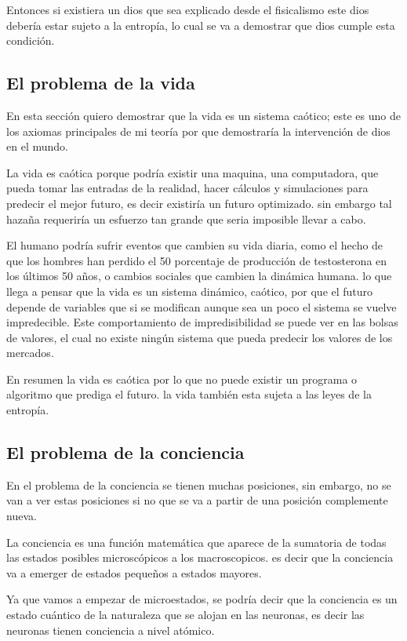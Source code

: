 \documentclass[12pt,letterpaper, a4paper ]{article}
\begin{document}
Entonces si existiera un dios que sea explicado desde el fisicalismo este dios debería estar sujeto a la entropía, lo cual se va a demostrar que dios cumple esta condición.

\subsection{El problema de la vida}

En esta sección quiero demostrar que la vida es un sistema caótico; este es uno de los axiomas principales de mi teoría por que demostraría la intervención de dios en el mundo. 

La vida es caótica porque podría existir una maquina, una computadora, que pueda tomar las entradas de la realidad, hacer cálculos y simulaciones para predecir el mejor futuro, es decir existiría un futuro optimizado. sin embargo tal hazaña requeriría  un esfuerzo tan grande que seria imposible llevar a cabo.

El humano podría sufrir eventos que cambien su vida diaria, como el hecho de que los hombres han perdido el 50 porcentaje de producción de testosterona en los últimos 50 años, o cambios sociales que cambien la dinámica humana. lo que llega a pensar que la vida es un sistema dinámico, caótico, por que el futuro depende de variables que si se modifican aunque sea un poco el sistema se vuelve impredecible. Este comportamiento de impredisibilidad se puede ver en las bolsas de valores, el cual no existe ningún sistema que pueda predecir los valores de los mercados.

En resumen la vida es caótica por lo que no puede existir un programa o algoritmo que prediga el futuro. la vida también esta sujeta a las leyes de la entropía.

\subsection{El problema de la conciencia}
En el problema de la conciencia se tienen muchas posiciones, sin embargo, no se van a ver estas posiciones si no que se va a partir de una posición complemente nueva.

La conciencia es una función matemática que aparece de la sumatoria de todas las estados posibles microscópicos a los macroscopicos. es decir que la conciencia va a emerger de estados pequeños a estados mayores. 

Ya que vamos a empezar de microestados, se podría decir que la conciencia es un estado cuántico de la naturaleza que se alojan en las neuronas, es decir las neuronas tienen conciencia a nivel atómico.
\end{document}
